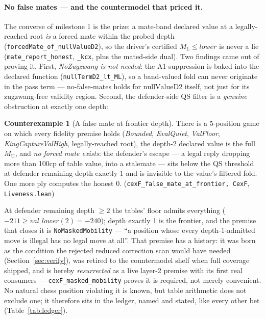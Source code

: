 \documentclass[11pt]{article}
\newcommand{\MU}{M_{\mathrm{U}}}    %
\newcommand{\ML}{M_{\mathrm{L}}}    %
\newcommand{\leanref}[2]{(\texttt{#1}, \texttt{#2})}%
\theoremstyle{plain}
\theoremstyle{definition}
\newtheorem{counterexample}[theorem]{Counterexample}
\theoremstyle{remark}
\begin{document}
\paragraph{No false mates --- and the countermodel that priced it.}
The converse of milestone 1 is the prize: a mate-band declared value
at a legally-reached root \emph{is} a forced mate within the probed
depth (\texttt{forcedMate\_of\_nullValueD2}), so the driver's
certified $\ML \le \mathit{lower}$ is never a lie
(\texttt{mate\_report\_honest}, \texttt{\_kcx}, plus the mated-side
dual).  Two findings came out of proving it.  First,
\emph{NoZugzwang is not needed}: the A1 suppression is baked into the
declared function (\texttt{nullTermD2\_lt\_ML}), so a band-valued fold
can never originate in the pass term --- no-false-mates holds for
$\mathrm{nullValueD2}$ itself, not just for its zugzwang-free validity
region.  Second, the defender-side QS filter is a \emph{genuine}
obstruction at exactly one depth:

\begin{counterexample}[A false mate at frontier depth]
\label{cex:frontier}
There is a 5-position game on which every fidelity premise holds
(\emph{Bounded}, \emph{EvalQuiet}, \emph{ValFloor},
\emph{KingCaptureValHigh}, legally-reached root), the depth-2 declared
value is the full $\MU$, and \emph{no forced mate exists}: the
defender's escape --- a legal reply dropping more than 100cp of table
value, into a stalemate --- sits below the QS threshold at defender
remaining depth exactly 1 and is invisible to the value's filtered
fold.  One more ply computes the honest $0$.
\leanref{cexF\_false\_mate\_at\_frontier, CexF}{Liveness.lean}
\end{counterexample}

At defender remaining depth $\ge 2$ the tables' floor admits
everything ($-211 \ge \mathit{val\_lower}(2) = -240$); depth exactly 1
is the frontier, and the premise that closes it is
\texttt{NoMaskedMobility} --- ``a position whose every
depth-1-admitted move is illegal has no legal move at all''.  That
premise has a history: it was born as the condition the rejected
reduced correction scan would have needed
(Section~\ref{sec:verify}), was retired to the countermodel shelf when
full coverage shipped, and is hereby \emph{resurrected} as a live
layer-2 premise with its first real consumers ---
\texttt{cexF\_masked\_mobility} proves it is required, not merely
convenient.  No natural chess position violating it is known, but
table arithmetic does not exclude one; it therefore sits in the
ledger, named and stated, like every other bet
(Table~\ref{tab:ledger}).
\end{document}
